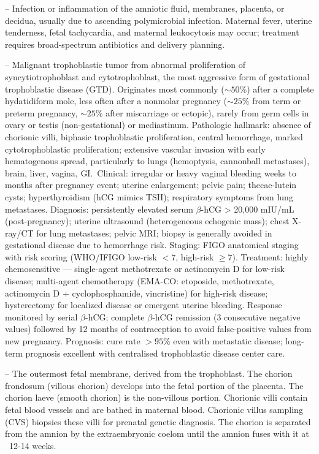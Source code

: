 -- Infection or inflammation of the amniotic fluid, membranes, placenta, or decidua, usually due to ascending polymicrobial infection. Maternal fever, uterine tenderness, fetal tachycardia, and maternal leukocytosis may occur; treatment requires broad-spectrum antibiotics and delivery planning.

-- Malignant trophoblastic tumor from abnormal proliferation of syncytiotrophoblast and cytotrophoblast, the most aggressive form of gestational trophoblastic disease (GTD). Originates most commonly ($\sim 50\%$) after a complete hydatidiform mole, less often after a nonmolar pregnancy ($\sim 25\%$ from term or preterm pregnancy, $\sim 25\%$ after miscarriage or ectopic), rarely from germ cells in ovary or testis (non-gestational) or mediastinum. Pathologic hallmark: absence of chorionic villi, biphasic trophoblastic proliferation, central hemorrhage, marked cytotrophoblastic proliferation; extensive vascular invasion with early hematogenous spread, particularly to lungs (hemoptysis, cannonball metastases), brain, liver, vagina, GI.\ Clinical: irregular or heavy vaginal bleeding weeks to months after pregnancy event; uterine enlargement; pelvic pain; thecae-lutein cysts; hyperthyroidism (hCG mimics TSH); respiratory symptoms from lung metastases. Diagnosis: persistently elevated serum $\beta$-hCG > 20,000 mIU/mL (post-pregnancy); uterine ultrasound (heterogeneous echogenic mass); chest X-ray/CT for lung metastases; pelvic MRI; biopsy is generally avoided in gestational disease due to hemorrhage risk. Staging: FIGO anatomical staging with risk scoring (WHO/IFIGO low-risk $< 7$, high-risk $\ge 7$). Treatment: highly chemosensitive — single-agent methotrexate or actinomycin D for low-risk disease; multi-agent chemotherapy (EMA-CO: etoposide, methotrexate, actinomycin D + cyclophosphamide, vincristine) for high-risk disease; hysterectomy for localized disease or emergent uterine bleeding. Response monitored by serial $\beta$-hCG; complete $\beta$-hCG remission (3 consecutive negative values) followed by 12 months of contraception to avoid false-positive values from new pregnancy. Prognosis: cure rate $> 95\%$ even with metastatic disease; long-term prognosis excellent with centralised trophoblastic disease center care.

-- The outermost fetal membrane, derived from the trophoblast. The chorion frondosum (villous chorion) develops into the fetal portion of the placenta. The chorion laeve (smooth chorion) is the non-villous portion. Chorionic villi contain fetal blood vessels and are bathed in maternal blood. Chorionic villus sampling (CVS) biopsies these villi for prenatal genetic diagnosis. The chorion is separated from the amnion by the extraembryonic coelom until the amnion fuses with it at ~12-14 weeks.

